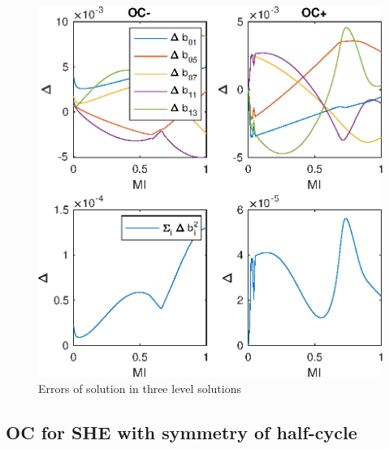 \begin{figure}
    \centering
    \includegraphics[scale=0.7]{img/EX01_3LVL.eps}
    \caption{Errors of solution in three level solutions}
\end{figure}


\subsection{OC for SHE with symmetry of half-cycle}